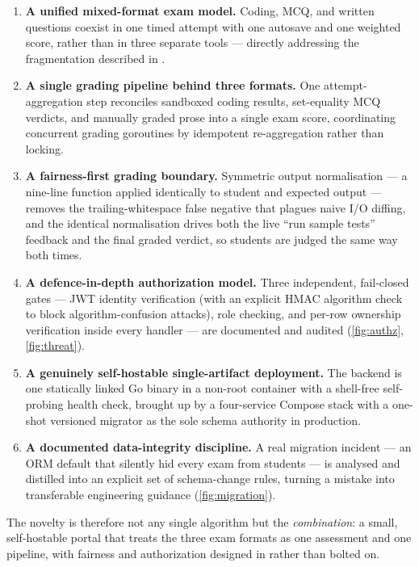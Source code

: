 \begin{enumerate}
  \item \textbf{A unified mixed-format exam model.} Coding, MCQ, and written
  questions coexist in one timed attempt with one autosave and one weighted
  score, rather than in three separate tools --- directly addressing the
  fragmentation described in .

  \item \textbf{A single grading pipeline behind three formats.} One
  attempt-aggregation step reconciles sandboxed coding results, set-equality
  MCQ verdicts, and manually graded prose into a single exam score, coordinating
  concurrent grading goroutines by idempotent re-aggregation rather than
  locking.

  \item \textbf{A fairness-first grading boundary.} Symmetric output
  normalisation --- a nine-line function applied identically to student and
  expected output --- removes the trailing-whitespace false negative that
  plagues naive I/O diffing, and the identical normalisation drives both the
  live ``run sample tests'' feedback and the final graded verdict, so students
  are judged the same way both times.

  \item \textbf{A defence-in-depth authorization model.} Three independent,
  fail-closed gates --- JWT identity verification (with an explicit HMAC
  algorithm check to block algorithm-confusion attacks), role checking, and
  per-row ownership verification inside every handler --- are documented and
  audited (\cref{fig:authz}, \cref{fig:threat}).

  \item \textbf{A genuinely self-hostable single-artifact deployment.} The
  backend is one statically linked Go binary in a non-root container
  with a shell-free self-probing health check, brought up by
  a four-service Compose stack with a one-shot versioned migrator as the sole
  schema authority in production.

  \item \textbf{A documented data-integrity discipline.} A real
  migration incident --- an ORM default that silently hid every exam from
  students --- is analysed and distilled into an explicit set of
  schema-change rules, turning a mistake into transferable engineering guidance
  (\cref{fig:migration}).
\end{enumerate}

The novelty is therefore not any single algorithm but the \emph{combination}:
a small, self-hostable portal that treats the three exam formats as one
assessment and one pipeline, with fairness and authorization designed in rather
than bolted on.


